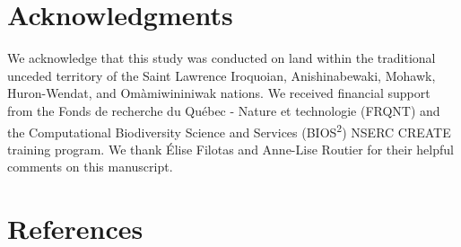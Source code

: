 \documentclass[10pt,oneside]{article}
\begin{document}
\hypertarget{acknowledgments}{%
\section{Acknowledgments}\label{acknowledgments}}

We acknowledge that this study was conducted on land within the
traditional unceded territory of the Saint Lawrence Iroquoian,
Anishinabewaki, Mohawk, Huron-Wendat, and Omàmiwininiwak nations. We
received financial support from the Fonds de recherche du Québec -
Nature et technologie (FRQNT) and the Computational Biodiversity Science
and Services (BIOS\textsuperscript{2}) NSERC CREATE training program. We
thank Élise Filotas and Anne-Lise Routier for their helpful comments on
this manuscript.

\hypertarget{references}{%
\section*{References}\label{references}}
\end{document}
